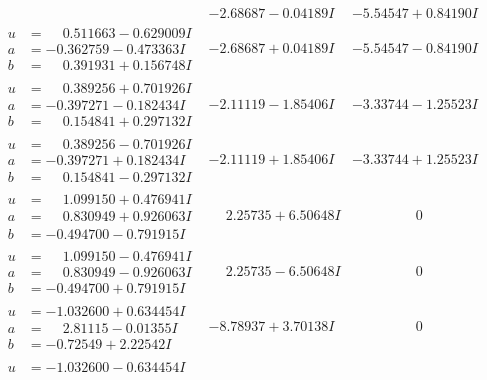 \documentclass[1p]{elsarticle_modified}
\theoremstyle{definition}
\begin{document}
$$\begin{array}{c|c|c}
 & -2.68687 - 0.04189 I & -5.54547 + 0.84190 I \\ \hline\begin{aligned}
u &= \phantom{-}0.511663 - 0.629009 I \\
a &= -0.362759 - 0.473363 I \\
b &= \phantom{-}0.391931 + 0.156748 I\end{aligned}
 & -2.68687 + 0.04189 I & -5.54547 - 0.84190 I \\ \hline\begin{aligned}
u &= \phantom{-}0.389256 + 0.701926 I \\
a &= -0.397271 - 0.182434 I \\
b &= \phantom{-}0.154841 + 0.297132 I\end{aligned}
 & -2.11119 - 1.85406 I & -3.33744 - 1.25523 I \\ \hline\begin{aligned}
u &= \phantom{-}0.389256 - 0.701926 I \\
a &= -0.397271 + 0.182434 I \\
b &= \phantom{-}0.154841 - 0.297132 I\end{aligned}
 & -2.11119 + 1.85406 I & -3.33744 + 1.25523 I \\ \hline\begin{aligned}
u &= \phantom{-}1.099150 + 0.476941 I \\
a &= \phantom{-}0.830949 + 0.926063 I \\
b &= -0.494700 - 0.791915 I\end{aligned}
 & \phantom{-}2.25735 + 6.50648 I & \phantom{-0.000000 } 0 \\ \hline\begin{aligned}
u &= \phantom{-}1.099150 - 0.476941 I \\
a &= \phantom{-}0.830949 - 0.926063 I \\
b &= -0.494700 + 0.791915 I\end{aligned}
 & \phantom{-}2.25735 - 6.50648 I & \phantom{-0.000000 } 0 \\ \hline\begin{aligned}
u &= -1.032600 + 0.634454 I \\
a &= \phantom{-}2.81115 - 0.01355 I \\
b &= -0.72549 + 2.22542 I\end{aligned}
 & -8.78937 + 3.70138 I & \phantom{-0.000000 } 0 \\ \hline\begin{aligned}
u &= -1.032600 - 0.634454 I \\

\end{aligned}
\end{array}$$
\end{document}
